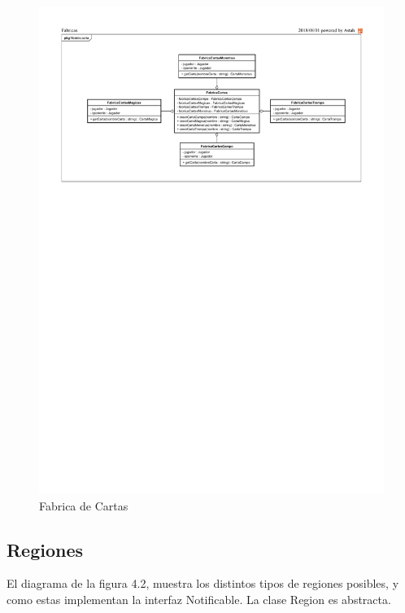\begin{figure}[H]
	\centering
	\includegraphics[scale=0.8]{includes/class_FabricaCartas}
	\caption{Fabrica de Cartas}
	\label{class_FabricaCartas}
\end{figure}

\subsection{Regiones}

El diagrama de la figura 4.2, muestra los distintos tipos de regiones posibles, y como estas implementan la interfaz Notificable. La clase Region es abstracta.

